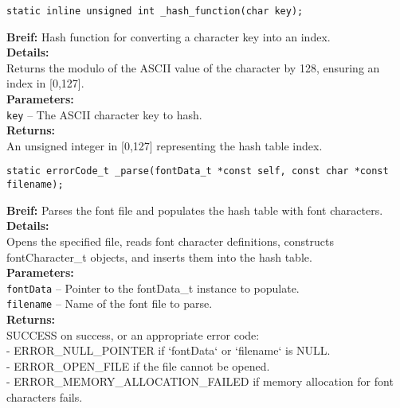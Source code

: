 \begin{verbatim}
static inline unsigned int _hash_function(char key);
\end{verbatim}
\textbf{Breif:} Hash function for converting a character key into an index. \\
\textbf{Details:} \\
\hspace*{1cm}Returns the modulo of the ASCII value of the character by 128, ensuring an index in [0,127]. \\
\textbf{Parameters:} \\
\hspace*{1cm}\texttt{key} -- The ASCII character key to hash. \\
\textbf{Returns:} \\
\hspace*{1cm}An unsigned integer in [0,127] representing the hash table index. \\[1em]

\begin{verbatim}
static errorCode_t _parse(fontData_t *const self, const char *const filename);
\end{verbatim}
\textbf{Breif:} Parses the font file and populates the hash table with font characters. \\
\textbf{Details:} \\
\hspace*{1cm}Opens the specified file, reads font character definitions, constructs fontCharacter\_t objects, and inserts them into the hash table. \\
\textbf{Parameters:} \\
\hspace*{1cm}\texttt{fontData} -- Pointer to the fontData\_t instance to populate. \\
\hspace*{1cm}\texttt{filename} -- Name of the font file to parse. \\
\textbf{Returns:} \\
\hspace*{1cm}SUCCESS on success, or an appropriate error code: \\
\hspace*{1cm}- ERROR\_NULL\_POINTER if `fontData` or `filename` is NULL. \\
\hspace*{1cm}- ERROR\_OPEN\_FILE if the file cannot be opened. \\
\hspace*{1cm}- ERROR\_MEMORY\_ALLOCATION\_FAILED if memory allocation for font characters fails. \\[1em]

